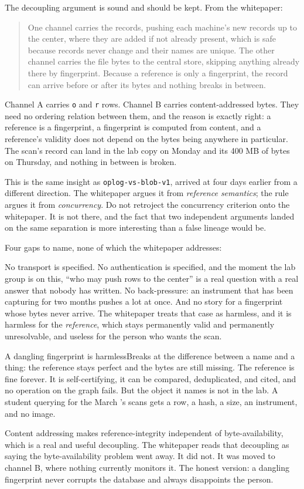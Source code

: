 The decoupling argument is sound and should be kept. From the whitepaper:

\begin{quote}
One channel carries the records, pushing each machine's new records up to the center, where they are added if not already present, which is safe because records never change and their names are unique. The other channel carries the file bytes to the central store, skipping anything already there by fingerprint. Because a reference is only a fingerprint, the record can arrive before or after its bytes and nothing breaks in between.
\end{quote}

Channel A carries \texttt{o} and \texttt{r} rows. Channel B carries content-addressed bytes. They need no ordering relation between them, and the reason is exactly right: a reference is a fingerprint, a fingerprint is computed from content, and a reference's validity does not depend on the bytes being anywhere in particular. The \labInstrumentShort scan's record can land in the lab copy on Monday and its 400 MB of bytes on Thursday, and nothing in between is broken.

This is the same insight as \texttt{oplog-vs-blob-v1}, arrived at four days earlier from a different direction. The whitepaper argues it from \emph{reference semantics}; the rule argues it from \emph{concurrency}. Do not retroject the concurrency criterion onto the whitepaper. It is not there, and the fact that two independent arguments landed on the same separation is more interesting than a false lineage would be.

Four gaps to name, none of which the whitepaper addresses:

No transport is specified. No authentication is specified, and the moment the lab group is on this, ``who may push rows to the center'' is a real question with a real answer that nobody has written. No back-pressure: an instrument that has been capturing for two months pushes a lot at once. And no story for a fingerprint whose bytes never arrive. The whitepaper treats that case as harmless, and it is harmless for the \emph{reference}, which stays permanently valid and permanently unresolvable, and useless for the person who wants the scan.

\begin{Analogy}{A dangling fingerprint is harmless}{Breaks at the difference between a name and a thing: the reference stays perfect and the bytes are still missing.}
The reference is fine forever. It is self-certifying, it can be compared, deduplicated, and cited, and no operation on the graph fails. But the object it names is not in the lab. A student querying for the March \labRun's \labInstrumentShort scans gets a row, a hash, a size, an instrument, and no image.

Content addressing makes reference-integrity independent of byte-availability, which is a real and useful decoupling. The whitepaper reads that decoupling as saying the byte-availability problem went away. It did not. It was moved to channel B, where nothing currently monitors it. The honest version: a dangling fingerprint never corrupts the database and always disappoints the person.
\end{Analogy}

